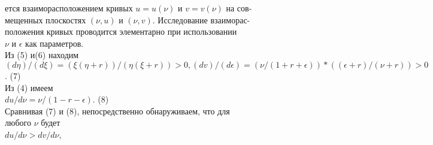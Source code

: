 \documentclass{article}
\begin{document}
ется взаиморасположением кривых $u=u(\nu)$ и $v=v(\nu)$ на сов-\\
мещенных плоскостях $(\nu, u)$ и $(\nu, v)$. Исследование взаиморас-\\
положения кривых проводится элементарно при использовании\\
$\nu$ и $\epsilon$ как параметров.\\%
Из (5) и(6) находим\\
$(d\eta)/(d\xi)=(\xi(\eta+r))/(\eta(\xi+r))> 0, (dv)/(d\epsilon)=(\nu/(1+r+\epsilon))*((\epsilon+r)/(\nu+r))>0$. (7)\\%
Из (4) имеем\\%
$du/d\nu=\nu/(1-r-\epsilon)$. (8)\\
Сравнивая (7) и (8), непосредственно обнаруживаем, что для\\
любого $\nu$ будет\\
$du/d\nu>dv/d\nu$,\\
\end{document}
